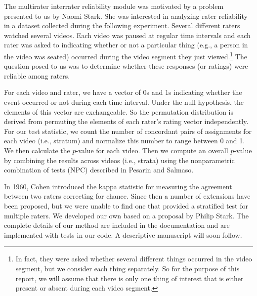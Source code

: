 The multirater interrater reliability module was motivated by a problem
presented to us by Naomi Stark.  She was interested in analyzing rater
reliability in a dataset collected during the following experiment.  Several
different raters watched several videos.  Each video was paused at regular time
intervals and each rater was asked to indicating whether or not a particular
thing (e.g., a person in the video was seated) occurred during the video
segment they just viewed.\footnote{In fact, they were asked whether several
different things occurred in the video segment, but we consider each thing
separately.  So for the purpose of this report, we will assume that there is
only one thing of interest that is either present or absent during each video
segment.} The question posed to us was to determine whether these responses (or
ratings) were reliable among raters. 

For each video and rater, we have a vector of 0s and 1s indicating whether the
event occurred or not during each time interval.  Under the null hypothesis,
the elements of this vector are exchangeable.  So the permutation distribution
is derived from permuting the elements of each rater's rating vector
independently.  For our test statistic, we count the number of concordant pairs
of assignments for each video (i.e., stratum) and normalize this number to
range between 0 and 1.  We then calculate the $p$-value for each video.  Then we
compute an overall $p$-value by combining the results across videos (i.e.,
strata) using the nonparametric combination of tests (NPC) described in Pesarin
and Salmaso.

In 1960, Cohen \cite{cohen1960} introduced the kappa statistic for measuring
the agreement between two raters correcting for chance.  Since then a number of
extensions have been proposed, but we were unable to find one that provided a
stratified test for multiple raters. We developed our own based on a proposal
by Philip Stark. The complete details of our method are included in the
documentation and are implemented with tests in our code.  A descriptive
manuscript will soon follow.
